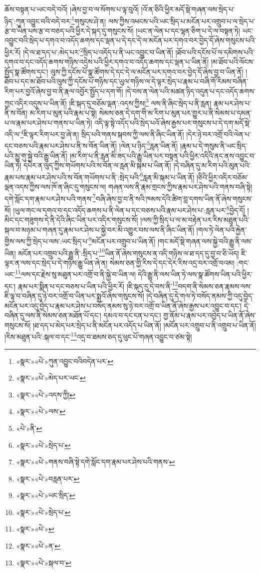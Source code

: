 ཆོས་བསྟན་པ་ཡང་བདེ་བའོ། །ཞེས་བྱ་བ་ལ་སོགས་པ་ལྟ་བུའོ། །འོ་ན་ཅིའི་ཕྱིར་མདོ་སྡེ་གཞན་ལས་སྲེད་པ་ཉིད་:ཀུན་འབྱུང་བའི་བདེ་བར་\footnote{«སྣར་»«པེ་»ཀུན་འབྱུང་བའིབདེན་པར་}གསུངས་ཤེ་ན། ལས་ཀྱིས་འཕངས་པའི་ཡང་སྲིད་པ་མངོན་པར་འགྲུབ་པ་ལ་སྲེད་པ་རྩ་བ་ཡིན་པས་རྩ་བ་བཅད་པའི་ཕྱིར་དེ་སྐད་དུ་གསུངས་སོ། །ཡང་ན་ལེན་པ་དང་ལྷན་ཅིག་པ་དེ་ལ་བསྟན་ཏེ། ཡང་འབྱུང་བའི་སྲེད་པ་དགའ་བ་འདོད་ཆགས་དང་ལྡན་པ་དེ་དང་དེ་ལ་མངོན་པར་དགའ་བར་བྱེད་དོ་ཞེས་གསུངས་པའི་ཕྱིར་རོ། །དེ་ལ་ཐ་དད་པ་:མེད་པར་\footnote{«སྣར་»«པེ་»མེད་པར་ཡང་}སྲིད་པ་འདོད་པ་ནི་ཡང་འབྱུང་བ་ཡིན་ནོ། །ཐོབ་པའི་དངོས་པོ་ལ་དམིགས་པའི་དགའ་བ་དང་འདོད་ཆགས་གཉིས་འདྲེས་པའི་ཕྱིར་དགའ་བ་འདོད་ཆགས་དང་ལྡན་པ་ཡིན་ནོ། །མ་ཐོབ་པའི་ལོངས་སྤྱོད་སྣ་ཚོགས་དང་། ལུས་ཀྱི་དངོས་པོ་སྣ་ཚོགས་དེ་དང་དེ་ལ་མངོན་པར་དགའ་བར་བྱེད་དོ་ཞེས་བྱ་བ་ཡིན་ནོ། །ཐོབ་པ་དང་མ་ཐོབ་པའི་ལུས་ཀྱི་དངོས་པོ་གཉིས་དང་ཡུལ་གཉིས་ལ་དེ་ལྟར་སྲེད་པ་རྣམ་པ་བཞི་གོ་རིམས་བཞིན་རིག་པར་བྱའོ་ཞེས་བྱ་བ་ནི་རྣལ་འབྱོར་སྤྱོད་པ་དག་གོ། །དེ་བས་ན་ལེན་པའི་མཚན་ཉིད་འདུན་པ་དང་འདོད་ཆགས་ཀྱང་འདིར་འདུས་པ་ཡིན་ནོ། །ཇི་སྐད་དུ་བཅོམ་ལྡན་:འདས་ཀྱིས།\footnote{«སྣར་»«པེ་»འདས་ཀྱི།} ལས་ནི་ཞིང་སྲེད་པ་ནི་རླན། རྣམ་པར་ཤེས་པ་ནི་ས་བོན། མ་རིག་པ་མུན་པའི་རྣམ་པ་སྟེ། སེམས་ཅན་དེ་དག་གི་མ་རིག་པ་མུན་པར་གྱུར་པ་ནི་སེམས་པ་དམན་པ་ལ་རྣམ་པར་ཤེས་པ་གནས་པ་ཡིན་ཏེ། འདི་ལྟ་སྟེ་འདོད་པའི་སྲེད་པའོ་ཞེས་རྒྱས་པར་གསུངས་པ་དེ་དག་མདོ་སྡེ་འདི་ལ་\footnote{«སྣར་»«པེ་»ལས་}ཇི་ལྟར་རིག་པར་བྱ་ཞེ་ན། སྲིད་པའི་གནས་སྐབས་ཀྱི་ལས་ནི་ཞིང་ཡིན་ནོ། །དེར་ཉེ་བར་འགྲོ་བའི་ལེན་པ་དང་བཅས་པའི་རྣམ་པར་ཤེས་པ་ནི་ས་བོན་ཡིན་ནོ། །ལེན་པ་ཉིད་\footnote{«པེ་»ནི་}རླན་ཡིན་ནོ། །རྣམ་པ་དེ་གསུམ་ནི་ཡང་སྲིད་པའི་མྱུ་གུ་སྐྱེ་བའི་རྒྱུ་ཡིན་ནོ། །མ་རིག་པ་ནི་རླན་མི་ཟད་པའི་རྒྱུ་ཡིན་པར་བསྟན་པའི་ཕྱིར་འདིའི་ནང་ནས་འབྱུང་བ་ཡིན་ཏེ། དཔེར་ན་ལུད་ཀྱིས་གཡོགས་པའི་ས་བོན་ལ་རླན་མི་སྐམ་པ་ཡིན་ནོ། །དེ་བཞིན་དུ་མ་རིག་པའི་མུན་པའི་རྣམ་པས་རྣམ་པར་ཤེས་པའི་ས་བོན་གཡོགས་པ་ནི་:སྲེད་པའི་\footnote{«སྣར་»«པེ་»སྲེད་པ་}རླན་མི་སྐམ་པ་ཡིན་ནོ། །ཅིའི་ཕྱིར་འདིར་བཅོམ་ལྡན་འདས་ཀྱིས་ལས་ཁོ་ན་ཞིང་དུ་གསུངས་ལ། གཞན་ལས་ནི་རྣམ་གྲངས་ཀྱིས་རྣམ་པར་ཤེས་པའི་གནས་བཞི་སྟེ། དགེ་སློང་དག་རྣམ་པར་ཤེས་པའི་གནས་\footnote{«སྣར་»«པེ་»གནས་བཞི་སྟེ་དགེ་སློང་དག་རྣམ་པར་ཤེས་པའི་གནས་}བཞི་ཞེས་བྱ་བ་ནི་སའི་ཁམས་དེའི་ཚིག་བླ་དགས་ཡིན་ནོ་ཞེས་གསུངས་སོ། །ཡུལ་གང་ལ་དགའ་བ་དང་འདོད་ཆགས་པ་ནི་ལེན་པ་དང་བཅས་པའི་རྣམ་པར་ཤེས་པ་:རླན་པར་\footnote{«སྣར་»«པེ་»བརླན་པར་}བྱེད་དོ། །མིང་དང་གཟུགས་དེ་ནི་དེའི་ཞིང་ཡིན་པར་འདིར་གསུངས་སོ། །ལས་ཀྱི་སྲིད་པ་ལ་མ་བརྟེན་པར་རིས་མཐུན་པའི་སྐལ་བ་མཉམ་པ་གཞན་དུ་རྣམ་པར་ཤེས་པ་སྐྱེ་བར་མི་འགྱུར་བས་ལས་ནི་ཞིང་ཡིན་ནོ། །གལ་ཏེ་ལེན་པའི་རྐྱེན་གྱིས་ལས་ཀྱི་སྲེད་པ་ལས་:ཡང་སྲིད་པ་\footnote{«སྣར་»«པེ་»ཡང་སྲིད་}མངོན་པར་འགྲུབ་པ་ཡིན་ནོ། །གང་མདོ་སྡེ་གཞན་ལས་སྐྱེ་བའི་རྒྱུ་ནི་ལས་ཡིན། མངོན་པར་འགྲུབ་པའི་རྒྱུ་ནི་:སྲིད་པ་\footnote{«སྣར་»«པེ་»སྲེད་པ་}ཡིན་ནོ་ཞེས་གསུངས་ན་འདི་གཉིས་ལ་ཐ་དད་དུ་བྱ་བ་ཅི་ཡོད། ཇི་ལྟར་ན་ལས་དང་སྲེད་པ་དེ་གཉིས་རྒྱུ་ཡིན་ཞེ་ན། སེམས་ཅན་གྱི་རིས་དེ་དང་དེར་རིས་འདྲ་བར་འགྲོ་བའམ། :གང་ཡང་\footnote{«སྣར་»«པེ་»}ལས་དང་རྗེས་སུ་མཐུན་པར་འགྲོ་བ་ནི་སྐྱེ་བ་ཡིན་ལ། དེའི་རྒྱུ་ནི་ལས་ཡིན་ཏེ་ལས་སྣ་ཚོགས་ཡིན་པའི་ཕྱིར་དང་། རྣམ་པར་སྨིན་པ་དང་བཅས་པ་ཡིན་པའི་ཕྱིར་རོ། །ཇི་སྐད་དུ་དེ་བས་ནི་\footnote{«སྣར་»«པེ་»ན་}བདག་ནི་སེམས་ཅན་རྣམས་ལས་ཇི་ལྟ་བ་བཞིན་དུ་ཉེ་བར་འགྲོ་བ་ཡིན་པར་སྨྲའོ་ཞེས་གསུངས་སོ། །དེ་བཞིན་དུ་དེ་གལ་ཏེ་བསོད་ནམས་ཀྱི་འདུ་བྱེད་མངོན་པར་འདུ་བྱེད་པ་རྣམ་པར་ཤེས་པ་བསོད་ནམས་སུ་ཉེ་བར་འགྲོ་བ་ཡིན་ནོ་ཞེས་རྒྱས་པར་འབྱུང་བ་དང་། དེ་བཞིན་དུ་ལས་ནི་སེམས་ཅན་མཐོན་པོ་དང་། དམའ་བ་དང་ངན་པ་དང་། གྱ་ནོམ་པ་རྣམ་པར་འབྱེད་པ་ཡིན་ནོ་ཞེས་གསུངས་སོ། །ཐ་དད་པ་མེད་པར་སྲེད་པ་ནི་མངོན་པར་འདོད་པ་ཡིན་ནོ། །མངོན་པར་འགྲུབ་པ་ནི་འགྲུབ་པ་ཡིན་ནོ། །རིས་མཐུན་པའི་:སྐལ་བ་དང་\footnote{«སྣར་»«པེ་»སྐལ་བ་}འདྲ་བ་ཐམས་ཅད་དུ་ཕུང་པོ་གཞན་འབྱུང་བ་ཙམ་སྟེ། 